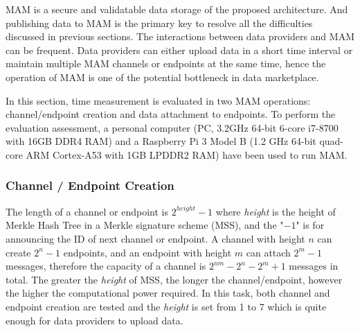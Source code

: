 \documentclass[conference]{IEEEtran}
\begin{document}
MAM is a secure and validatable data storage of the proposed architecture. And publishing data to MAM is the primary key to resolve all the difficulties discussed in previous sections. The interactions between data providers and MAM can be frequent. Data providers can either upload data in a short time interval or maintain multiple MAM channels or endpoints at the same time, hence the operation of MAM is one of the potential bottleneck in data marketplace.

In this section, time measurement is evaluated in two MAM operations: channel/endpoint creation and data attachment to endpoints. To perform the evaluation assessment, a personal computer (PC, 3.2GHz 64-bit 6-core i7-8700 with 16GB DDR4 RAM) and a Raspberry Pi 3 Model B (1.2 GHz 64-bit quad-core ARM Cortex-A53 with 1GB LPDDR2 RAM) have been used to run MAM. 

\subsubsection{Channel / Endpoint Creation}
The length of a channel or endpoint is $2^{height}-1$ where \textit{height} is the height of Merkle Hash Tree in a Merkle signature scheme (MSS), and the "$-1$" is for announcing the ID of next channel or endpoint. A channel with height $n$ can create $2^n-1$ endpoints, and an endpoint with height $m$ can attach $2^m-1$ messages, therefore the capacity of a channel is $2^{nm}-2^n-2^m+1$ messages in total. The greater the \textit{height} of MSS, the longer the channel/endpoint, however the higher the computational power required. In this task, both channel and endpoint creation are tested and the \textit{height} is set from 1 to 7 which is quite enough for data providers to upload data.
\end{document}
